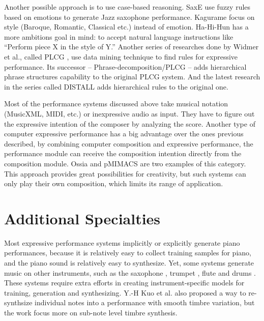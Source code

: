 Another possible approach is to use case-based reasoning. SaxE \cite{40,41,42} use fuzzy rules based on emotions to generate Jazz saxophone performance. Kagurame \cite{43,44} focus on style (Baroque, Romantic, Classical etc.) instead of emotion. Ha-Hi-Hun \cite{45} has a more ambitions goal in mind: to accept natural language instructions like \enquote{Perform piece X in the style of Y.} Another series of researches done by Widmer et al., called PLCG \cite{46, 47, 48}, use data mining technique to find rules for expressive performance. Its successor -- Phrase-decomposition/PLCG \cite{49} -- adds hierarchical phrase structures capability to the original PLCG system. And the latest research in the series called DISTALL \cite{50, 51} adds hierarchical rules to the original one.

Most of the performance systems discussed above take musical notation (MusicXML, MIDI, etc.) or inexpressive audio as input. They have to figure out the expressive intention of the composer by analyzing the score. Another type of computer expressive performance has a big advantage over the ones previous described, by combining computer composition and expressive performance, the performance module can receive the composition intention directly from the composition module. Ossia \cite{61} and pMIMACS \cite{pmimacs} are two examples of this category. This approach provides great possibilities for creativity, but such systems can only play their own composition, which limits its range of application.

\section{Additional Specialties}

Most expressive performance systems implicitly or explicitly generate piano performances, because it is relatively easy to collect training samples for piano, and the piano sound is relatively easy to synthesize. Yet, some systems generate music on other instruments, such as the saxophone \cite{40, 41, 42}, trumpet \cite{24, 25}, flute \cite{39} and drums \cite{56}. These systems require extra efforts in creating instrument-specific models for training, generation and synthesizing. Y.-H Kuo et al. \cite{profsu} also proposed a way to re-synthsize individual notes into a performance with smooth timbre variation, but the work focus more on sub-note level timbre synthesis.


